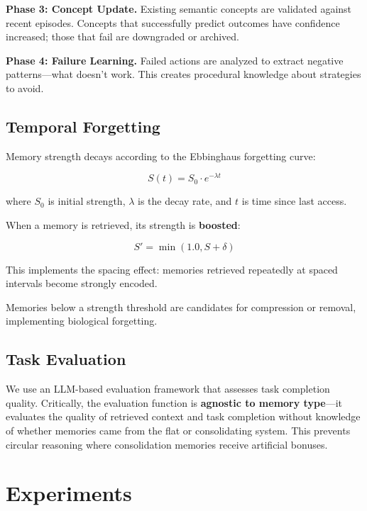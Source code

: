 \documentclass[11pt]{article}
\begin{document}
\textbf{Phase 3: Concept Update.}
Existing semantic concepts are validated against recent episodes. Concepts that successfully predict outcomes have confidence increased; those that fail are downgraded or archived.

\textbf{Phase 4: Failure Learning.}
Failed actions are analyzed to extract negative patterns---what doesn't work. This creates procedural knowledge about strategies to avoid.

\subsection{Temporal Forgetting}

Memory strength decays according to the Ebbinghaus forgetting curve:

\begin{equation}
    S(t) = S_0 \cdot e^{-\lambda t}
\end{equation}

where $S_0$ is initial strength, $\lambda$ is the decay rate, and $t$ is time since last access.

When a memory is retrieved, its strength is \textbf{boosted}:

\begin{equation}
    S' = \min(1.0, S + \delta)
\end{equation}

This implements the spacing effect: memories retrieved repeatedly at spaced intervals become strongly encoded.

Memories below a strength threshold are candidates for compression or removal, implementing biological forgetting.

\subsection{Task Evaluation}

We use an LLM-based evaluation framework that assesses task completion quality. Critically, the evaluation function is \textbf{agnostic to memory type}---it evaluates the quality of retrieved context and task completion without knowledge of whether memories came from the flat or consolidating system. This prevents circular reasoning where consolidation memories receive artificial bonuses.

\section{Experiments}
\end{document}

